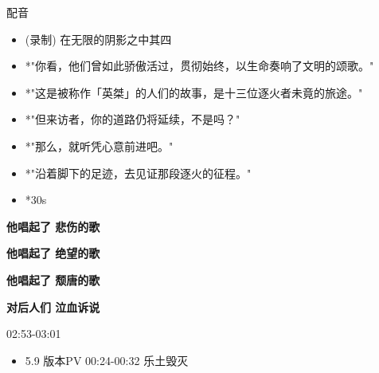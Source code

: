 \documentclass[a4paper]{article}
\begin{document}
配音

\begin{itemize}
    \item (录制) 在无限的阴影之中其四
    \item *"你看，他们曾如此骄傲活过，贯彻始终，以生命奏响了文明的颂歌。"
    \item *"这是被称作「英桀」的人们的故事，是十三位逐火者未竟的旅途。"
    \item *"但来访者，你的道路仍将延续，不是吗？"
    \item *"那么，就听凭心意前进吧。"
    \item *"沿着脚下的足迹，去见证那段逐火的征程。"
    \item *30s
\end{itemize}



\textbf{他唱起了 悲伤的歌}

\textbf{他唱起了 绝望的歌}

\textbf{他唱起了 颓唐的歌}

\textbf{对后人们 泣血诉说}

02:53-03:01

\begin{itemize}
    \item 5.9 版本PV 00:24-00:32 乐土毁灭
\end{itemize}

\end{document}

